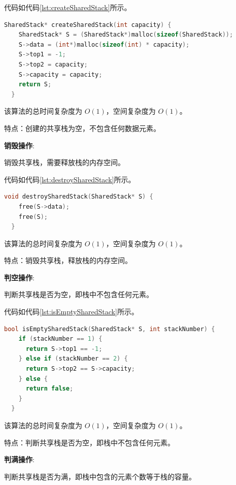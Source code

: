 \documentclass[lang=cn,newtx,10pt,scheme=chinese]{elegantbook}
\begin{document}
代码如代码\ref{lst:createSharedStack}所示。

\begin{lstlisting}[language=C++, caption={创建一个空共享栈示例代码}, label={lst:createSharedStack}]
  SharedStack* createSharedStack(int capacity) {
    SharedStack* S = (SharedStack*)malloc(sizeof(SharedStack));
    S->data = (int*)malloc(sizeof(int) * capacity);
    S->top1 = -1;
    S->top2 = capacity;
    S->capacity = capacity;
    return S;
  }

\end{lstlisting}

该算法的总时间复杂度为 $O(1)$，空间复杂度为 $O(1)$。

特点：创建的共享栈为空，不包含任何数据元素。

\textbf{销毁操作}:

销毁共享栈，需要释放栈的内存空间。

代码如代码\ref{lst:destroySharedStack}所示。

\begin{lstlisting}[language=C++, caption={销毁共享栈示例代码}, label={lst:destroySharedStack}]
  void destroySharedStack(SharedStack* S) {
    free(S->data);
    free(S);
  }

\end{lstlisting}

该算法的总时间复杂度为 $O(1)$，空间复杂度为 $O(1)$。

特点：销毁共享栈，释放栈的内存空间。

\textbf{判空操作}:

判断共享栈是否为空，即栈中不包含任何元素。

代码如代码\ref{lst:isEmptySharedStack}所示。

\begin{lstlisting}[language=C++, caption={判断共享栈是否为空示例代码}, label={lst:isEmptySharedStack}]
  bool isEmptySharedStack(SharedStack* S, int stackNumber) {
    if (stackNumber == 1) {
      return S->top1 == -1;
    } else if (stackNumber == 2) {
      return S->top2 == S->capacity;
    } else {
      return false;
    }
  }

\end{lstlisting}

该算法的总时间复杂度为 $O(1)$，空间复杂度为 $O(1)$。

特点：判断共享栈是否为空，即栈中不包含任何元素。

\textbf{判满操作}:

判断共享栈是否为满，即栈中包含的元素个数等于栈的容量。
\end{document}
